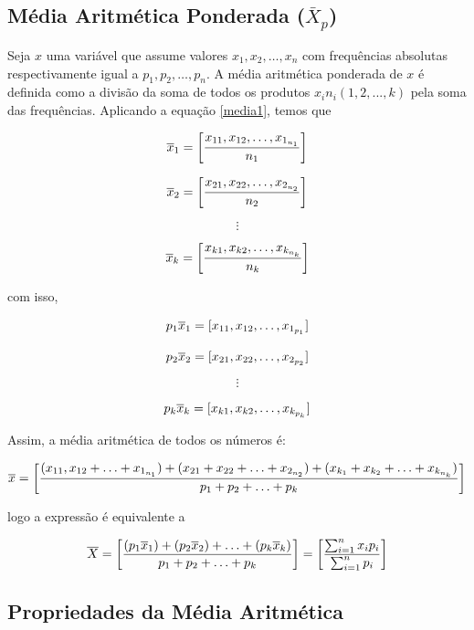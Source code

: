 \newpage
\subsection{Média Aritmética Ponderada ($\bar{X}_{p}$)}

Seja $x$ uma variável que assume valores $x_{1},x_{2},\ldots,x_{n}$ com frequências absolutas respectivamente igual a $p_{1},p_{2},\ldots,p_{n}$. A média aritmética ponderada de $x$ é  definida como a divisão da soma de todos os produtos $x_{i} n_{i}(1,2,...,k)$ pela soma das frequências. Aplicando a equação \ref{media1}, temos que


$$
\Bar{x}_{1}=  \left[ \frac{x_{11},x_{12},\ldots, x_{1_{n_{1}}}}{n_{1}} \right ]
$$

$$
\Bar{x}_{2} =  \left[ \frac{x_{21},x_{22},\ldots, x_{2_{n_{2}}}}{n_{2}} \right ]
$$

$$
\vdots
$$

$$
\Bar{x}_{k} = \left[ \frac{x_{k1},x_{k2},\ldots, x_{k_{n_{k}}}}{n_{k}}  \right ]
$$

com isso, 

$$
p_{1}\Bar{x}_{1} = [x_{11},x_{12},\ldots, x_{1_{p_{1}}}]
$$

$$
p_{2}\Bar{x}_{2} = [x_{21},x_{22},\ldots, x_{2_{p_{2}}}]
$$

$$
\vdots
$$

$$
p_{k}\Bar{x}_{k} = [x_{k1},x_{k2},\ldots, x_{k_{p_{k}}}]
$$

Assim, a média aritmética de todos os números é:

$$
\Bar{x} = \left[ \frac{(x_{11},x_{12}+\ldots+x_{1_{n_{1}}})+(x_{21}+x_{22}+\ldots+x_{2_{n_{2}}})+(x_{k_{1}}+x_{k_{2}}+\ldots+x_{k_{n_{k}}})}{p_{1}+p_{2}+\ldots+p_{k}} \right ]
$$


logo a expressão é equivalente a

\begin{equation}\label{media}
    \bar{X} =  \left[ \frac{(p_{1}\Bar{x}_{1})+(p_{2}\Bar{x}_{2})+\ldots+(p_{k}\Bar{x}_{k})}{p_{1}+p_{2}+\ldots+p_{k}} \right ]  =   \left[ \frac{\sum_{i=1}^{n}x_{i}p_{i}}{\sum_{i=1}^{n}p_{i}} \right ]
\end{equation}







\newpage
\subsection{Propriedades da Média Aritmética}

